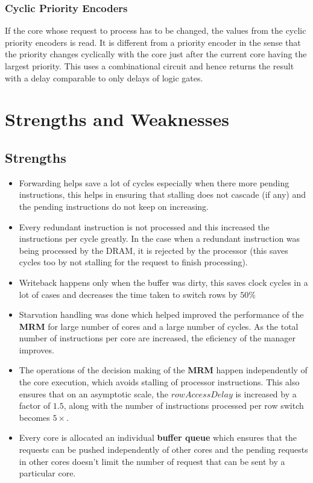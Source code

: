 \documentclass{article}
\begin{document}
\subsubsection*{Cyclic Priority Encoders}
If the core whose request to process has to be changed, the values from the cyclic priority encoders is read. It is different from a priority encoder in the sense that the priority changes cyclically with the core just after the current core having the largest priority. This uses a combinational circuit and hence returns the result with a delay comparable to only delays of logic gates.


\section{Strengths and Weaknesses}
\subsection{Strengths}
\begin{itemize}
    \item Forwarding helps save a lot of cycles especially when there more pending instructions, this helps in ensuring that stalling does not cascade (if any) and the pending instructions do not keep on increasing.
    \item Every redundant instruction is not processed and this increased the instructions per cycle greatly. In the case when a redundant instruction was being processed by the DRAM, it is rejected by the processor (this saves cycles too by not stalling for the request to finish processing).
    \item Writeback happens only when the buffer was dirty, this saves clock cycles in a lot of cases and decreases the time taken to switch rows by $50\%$
    \item Starvation handling was done which helped improved the performance of the \textbf{MRM} for large number of cores and a large number of cycles. As the total number of instructions per core are increased, the eficiency of the manager improves.
    \item The operations of the decision making of the \textbf{MRM} happen independently of the core execution, which avoids stalling of processor instructions. This also ensures that on an asymptotic scale, the $rowAccessDelay$ is increased by a factor of $1.5$, along with the number of instructions processed per row switch becomes $5\times$.
    \item Every core is allocated an individual \textbf{buffer queue} which ensures that the requests can be pushed independently of other cores and the pending requests in other cores doesn't limit the number of request that can be sent by a particular core.
\end{itemize}
\end{document}
